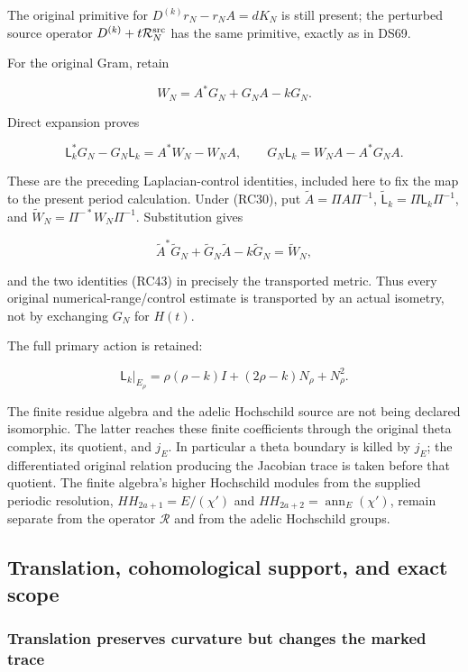 The original primitive for \(D^{(k)}r_N-r_NA=dK_N\) is still present; the perturbed source operator \(D^{(k)}+t\mathcal R_N^{\rm src}\) has the same primitive, exactly as in DS69.

For the original Gram, retain

\[
W_N=A^*G_N+G_NA-kG_N.
\tag{RC42}
\]

Direct expansion proves

\[
\mathsf L_k^*G_N-G_N\mathsf L_k=A^*W_N-W_NA,
\qquad G_N\mathsf L_k=W_NA-A^*G_NA.
\tag{RC43}
\]

These are the preceding Laplacian-control identities, included here to fix the map to the present period calculation. Under (RC30), put \(\widetilde A=\Pi A\Pi^{-1}\), \(\widetilde{\mathsf L}_k=\Pi\mathsf L_k\Pi^{-1}\), and \(\widetilde W_N=\Pi^{-*}W_N\Pi^{-1}\). Substitution gives

\[
\widetilde A^*\widetilde G_N+
\widetilde G_N\widetilde A-k\widetilde G_N=\widetilde W_N,
\tag{RC44}
\]

and the two identities (RC43) in precisely the transported metric. Thus every original numerical-range/control estimate is transported by an actual isometry, not by exchanging \(G_N\) for \(H(t)\).

The full primary action is retained:

\[
\mathsf L_k|_{E_\rho}
=\rho(\rho-k)I+(2\rho-k)N_\rho+N_\rho^2.
\tag{RC45}
\]

The finite residue algebra and the adelic Hochschild source are not being declared isomorphic. The latter reaches these finite coefficients through the original theta complex, its quotient, and \(j_E\). In particular a theta boundary is killed by \(j_E\); the differentiated original relation producing the Jacobian trace is taken before that quotient. The finite algebra's higher Hochschild modules from the supplied periodic resolution, \(HH_{2a+1}=E/(\chi')\) and \(HH_{2a+2}=\operatorname{ann}_E(\chi')\), remain separate from the operator \(\mathcal R\) and from the adelic Hochschild groups.

\subsection{Translation, cohomological support, and exact scope}\label{endpoint-residue_original--translation-cohomological-support-and-exact-scope}

\subsubsection{Translation preserves curvature but changes the marked trace}\label{endpoint-residue_original--translation-preserves-curvature-but-changes-the-marked-trace}

